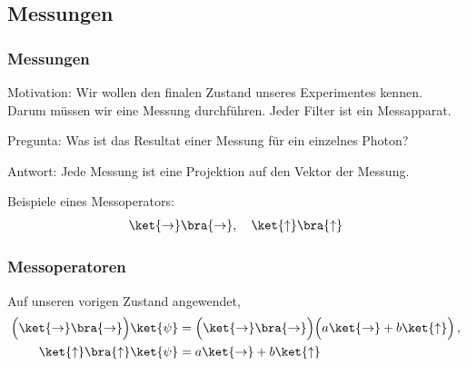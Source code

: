 \documentclass{beamer}
\begin{document}
\subsection{Messungen}

\begin{frame}
\frametitle{Messungen}
Motivation: Wir wollen den finalen Zustand unseres Experimentes kennen.  Darum m\"ussen wir eine Messung durchf\"uhren.  Jeder Filter ist ein Messapparat.

\bigskip
Pregunta: Was ist das Resultat einer Messung f\"ur ein einzelnes Photon?

\bigskip
Antwort: Jede Messung ist eine Projektion auf den Vektor der Messung.

\bigskip
Beispiele eines Messoperators:
\begin{align*}
    \ket{\rightarrow}\bra{\rightarrow},
    \quad
    \ket{\uparrow}\bra{\uparrow}
\end{align*}
\end{frame}

\begin{frame}
\frametitle{Messoperatoren}
Auf unseren vorigen Zustand angewendet,
\begin{align*}
    \Big(\ket{\rightarrow}\bra{\rightarrow}\Big) \ket{\psi}
    &=
    \Big(\ket{\rightarrow}\bra{\rightarrow}\Big)
    \Big(a\ket{\to} + b\ket{\uparrow}\Big)\,,
    \\
    \ket{\uparrow}\bra{\uparrow}
            \ket{\psi} &= a\ket{\to} + b\ket{\uparrow}
\end{align*}
\end{frame}
\end{document}
